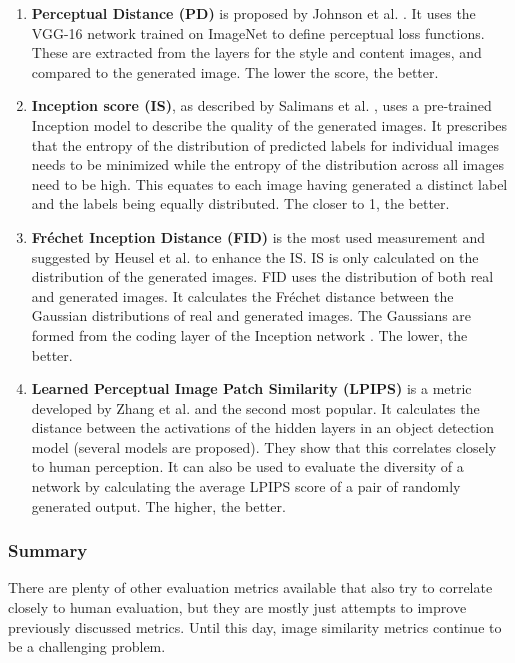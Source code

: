 \begin{enumerate}
	\item \textbf{Perceptual Distance (PD)} is proposed by Johnson et al. \cite{Johnson2016}.
	It uses the VGG-16 network \cite{Simonyan2015} trained on ImageNet \cite{Deng2009} to define perceptual loss functions.
	These are extracted from the layers for the style and content images, and compared to the generated image.
	The lower the score, the better.
	\item \textbf{Inception score (IS)}, as described by Salimans et al. \cite{Salimans2016}, uses a pre-trained Inception model \cite{Szegedy2015} to describe the quality of the generated images.
	It prescribes that the entropy of the distribution of predicted labels for individual images needs to be minimized while the entropy of the distribution across all images need to be high.
	This equates to each image having generated a distinct label and the labels being equally distributed.
	The closer to 1, the better.
	\item \textbf{Fréchet Inception Distance (FID)} is the most used measurement and suggested by Heusel et al. \cite{Heusel2017} to enhance the \gls{IS}.
	\gls{IS} is only calculated on the distribution of the generated images.
	\gls{FID} uses the distribution of both real and generated images.
	It calculates the Fréchet distance \cite{Frechet1957} between the Gaussian distributions of real and generated images.
	The Gaussians are formed from the coding layer of the Inception network \cite{Szegedy2015}.
	The lower, the better.
	\item \textbf{Learned Perceptual Image Patch Similarity (LPIPS)} is a metric developed by Zhang et al. \cite{Zhang2018} and the second most popular.
	It calculates the distance between the activations of the hidden layers in an object detection model (several models are proposed).
	They show that this correlates closely to human perception.
	It can also be used to evaluate the diversity of a network by calculating the average \gls{LPIPS} score of a pair of randomly generated output.
	The higher, the better.
\end{enumerate}

\subsubsection{Summary}
There are plenty of other evaluation metrics available that also try to correlate closely to human evaluation, but they are mostly just attempts to improve previously discussed metrics.
Until this day, image similarity metrics continue to be a challenging problem.

